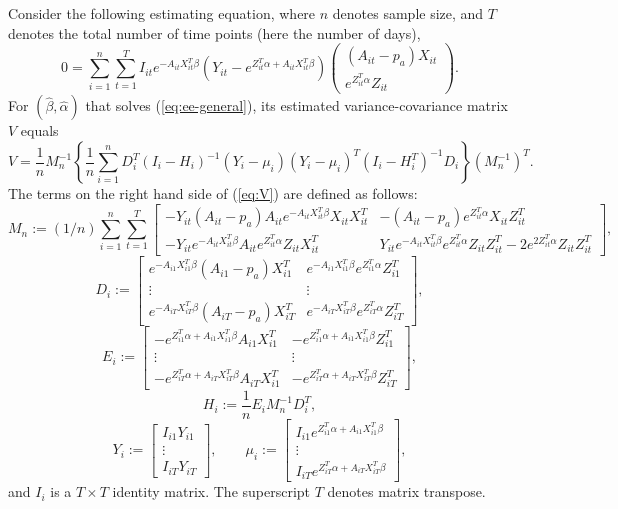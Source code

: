 \documentclass[11pt]{article}
\begin{document}
Consider the following estimating equation, where $n$ denotes sample
size, and $T$ denotes the total number of time points (here the number
of days),
\begin{equation}
0=\sum_{i=1}^{n}\sum_{t=1}^{T}I_{it} e^{-A_{it}X_{it}^{T}\beta}\left(Y_{it}-e^{Z_{it}^{T}\alpha+A_{it}X_{it}^{T}\beta}\right)\begin{pmatrix}(A_{it}-p_{a})X_{it}\\
e^{Z_{it}^{T}\alpha}Z_{it}
\end{pmatrix}.\label{eq:ee-general}
\end{equation}
For $(\hat{\beta},\hat{\alpha})$ that solves (\ref{eq:ee-general}),
its estimated variance-covariance matrix $V$ equals
\begin{equation}
V=\frac{1}{n}M_{n}^{-1}\left\{ \frac{1}{n}\sum_{i=1}^{n}D_{i}^{T}(I_{i}-H_{i})^{-1}(Y_{i}-\mu_{i})(Y_{i}-\mu_{i})^{T}(I_{i}-H_{i}^{T})^{-1}D_{i}\right\} \left(M_{n}^{-1}\right)^{T}.\label{eq:V}
\end{equation}
The terms on the right hand side of (\ref{eq:V}) are defined as follows:
\[
M_{n}:=(1/n)\sum_{i=1}^{n}\sum_{t=1}^{T}\begin{bmatrix}-Y_{it}(A_{it}-p_{a})A_{it}e^{-A_{it}X_{it}^{T}\beta}X_{it}X_{it}^{T} & -(A_{it}-p_{a})e^{Z_{it}^{T}\alpha}X_{it}Z_{it}^{T}\\
-Y_{it}e^{-A_{it}X_{it}^{T}\beta}A_{it}e^{Z_{it}^{T}\alpha}Z_{it}X_{it}^{T} & Y_{it}e^{-A_{it}X_{it}^{T}\beta}e^{Z_{it}^{T}\alpha}Z_{it}Z_{it}^{T}-2e^{2Z_{it}^{T}\alpha}Z_{it}Z_{it}^{T}
\end{bmatrix},
\]
\[
D_{i}:=\begin{bmatrix}e^{-A_{i1}X_{i1}^{T}\beta}(A_{i1}-p_{a})X_{i1}^{T} & e^{-A_{i1}X_{i1}^{T}\beta}e^{Z_{i1}^{T}\alpha}Z_{i1}^{T}\\
\vdots & \vdots\\
e^{-A_{iT}X_{iT}^{T}\beta}(A_{iT}-p_{a})X_{iT}^{T} & e^{-A_{iT}X_{iT}^{T}\beta}e^{Z_{iT}^{T}\alpha}Z_{iT}^{T}
\end{bmatrix},
\]
\[
E_{i}:=\begin{bmatrix}-e^{Z_{i1}^{T}\alpha+A_{i1}X_{i1}^{T}\beta}A_{i1}X_{i1}^{T} & -e^{Z_{i1}^{T}\alpha+A_{i1}X_{i1}^{T}\beta}Z_{i1}^{T}\\
\vdots & \vdots\\
-e^{Z_{iT}^{T}\alpha+A_{iT}X_{iT}^{T}\beta}A_{iT}X_{i1}^{T} & -e^{Z_{iT}^{T}\alpha+A_{iT}X_{iT}^{T}\beta}Z_{iT}^{T}
\end{bmatrix},
\]
\[
H_{i}:=\frac{1}{n}E_{i}M_{n}^{-1}D_{i}^{T},
\]
\[
Y_{i}:=\begin{bmatrix}I_{i1} Y_{i1}\\
\vdots\\
I_{iT} Y_{iT}
\end{bmatrix},\qquad\mu_{i}:=\begin{bmatrix}I_{i1} e^{Z_{i1}^{T}\alpha+A_{i1}X_{i1}^{T}\beta}\\
\vdots\\
I_{iT} e^{Z_{iT}^{T}\alpha+A_{iT}X_{iT}^{T}\beta}
\end{bmatrix},
\]
and $I_{i}$ is a $T\times T$ identity matrix. The superscript $T$
denotes matrix transpose.
\end{document}
